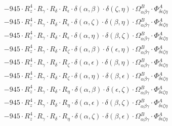 \documentclass{article}
\begin{document}
\begin{equation}
\begin{array}{c}
 \\[0.2em] 		 - 945 \cdot R_{z}^{4} \cdot R_{\gamma{}} \cdot R_{\delta{}} \cdot R_{\epsilon{}} \cdot \delta{}\left(\alpha{}, \beta{}\right) \cdot \delta{}\left(\zeta{}, \eta{}\right) \cdot \Omega{}^{B}_{\alpha{}\beta{}\gamma{}} \cdot \Phi{}^{A}_{\delta{}\epsilon{}\zeta{}\eta{}} 
 \\[0.2em] 		 - 945 \cdot R_{z}^{4} \cdot R_{\gamma{}} \cdot R_{\delta{}} \cdot R_{\epsilon{}} \cdot \delta{}\left(\alpha{}, \zeta{}\right) \cdot \delta{}\left(\beta{}, \eta{}\right) \cdot \Omega{}^{B}_{\alpha{}\beta{}\gamma{}} \cdot \Phi{}^{A}_{\delta{}\epsilon{}\zeta{}\eta{}} 
 \\[0.2em] 		 - 945 \cdot R_{z}^{4} \cdot R_{\gamma{}} \cdot R_{\delta{}} \cdot R_{\epsilon{}} \cdot \delta{}\left(\alpha{}, \eta{}\right) \cdot \delta{}\left(\beta{}, \zeta{}\right) \cdot \Omega{}^{B}_{\alpha{}\beta{}\gamma{}} \cdot \Phi{}^{A}_{\delta{}\epsilon{}\zeta{}\eta{}} 
 \\[0.2em] 		 - 945 \cdot R_{z}^{4} \cdot R_{\gamma{}} \cdot R_{\delta{}} \cdot R_{\zeta{}} \cdot \delta{}\left(\alpha{}, \beta{}\right) \cdot \delta{}\left(\epsilon{}, \eta{}\right) \cdot \Omega{}^{B}_{\alpha{}\beta{}\gamma{}} \cdot \Phi{}^{A}_{\delta{}\epsilon{}\zeta{}\eta{}} 
 \\[0.2em] 		 - 945 \cdot R_{z}^{4} \cdot R_{\gamma{}} \cdot R_{\delta{}} \cdot R_{\zeta{}} \cdot \delta{}\left(\alpha{}, \epsilon{}\right) \cdot \delta{}\left(\beta{}, \eta{}\right) \cdot \Omega{}^{B}_{\alpha{}\beta{}\gamma{}} \cdot \Phi{}^{A}_{\delta{}\epsilon{}\zeta{}\eta{}} 
 \\[0.2em] 		 - 945 \cdot R_{z}^{4} \cdot R_{\gamma{}} \cdot R_{\delta{}} \cdot R_{\zeta{}} \cdot \delta{}\left(\alpha{}, \eta{}\right) \cdot \delta{}\left(\beta{}, \epsilon{}\right) \cdot \Omega{}^{B}_{\alpha{}\beta{}\gamma{}} \cdot \Phi{}^{A}_{\delta{}\epsilon{}\zeta{}\eta{}} 
 \\[0.2em] 		 - 945 \cdot R_{z}^{4} \cdot R_{\gamma{}} \cdot R_{\delta{}} \cdot R_{\eta{}} \cdot \delta{}\left(\alpha{}, \beta{}\right) \cdot \delta{}\left(\epsilon{}, \zeta{}\right) \cdot \Omega{}^{B}_{\alpha{}\beta{}\gamma{}} \cdot \Phi{}^{A}_{\delta{}\epsilon{}\zeta{}\eta{}} 
 \\[0.2em] 		 - 945 \cdot R_{z}^{4} \cdot R_{\gamma{}} \cdot R_{\delta{}} \cdot R_{\eta{}} \cdot \delta{}\left(\alpha{}, \epsilon{}\right) \cdot \delta{}\left(\beta{}, \zeta{}\right) \cdot \Omega{}^{B}_{\alpha{}\beta{}\gamma{}} \cdot \Phi{}^{A}_{\delta{}\epsilon{}\zeta{}\eta{}} 
 \\[0.2em] 		 - 945 \cdot R_{z}^{4} \cdot R_{\gamma{}} \cdot R_{\delta{}} \cdot R_{\eta{}} \cdot \delta{}\left(\alpha{}, \zeta{}\right) \cdot \delta{}\left(\beta{}, \epsilon{}\right) \cdot \Omega{}^{B}_{\alpha{}\beta{}\gamma{}} \cdot \Phi{}^{A}_{\delta{}\epsilon{}\zeta{}\eta{}} 

\end{array}
\end{equation}
\end{document}
